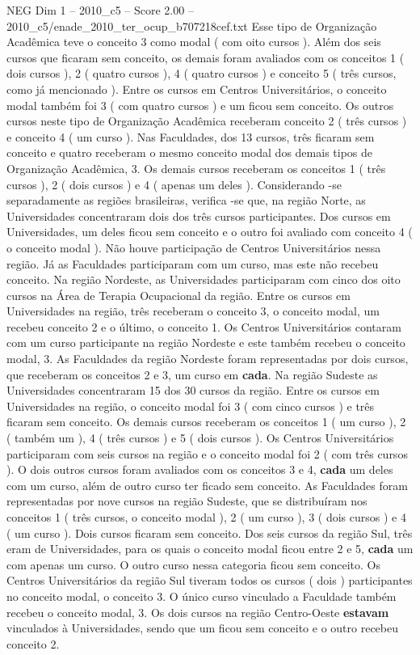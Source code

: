 \begin{textsample}{NEG Dim 1 – 2010\_c5 – Score 2.00 – 2010\_c5/enade\_2010\_ter\_ocup\_b707218cef.txt}
Esse tipo de Organização Acadêmica teve o conceito 3 como modal ( com oito cursos ).
Além dos seis cursos que ficaram sem conceito, os demais foram avaliados com os conceitos 1 ( dois cursos ), 2 ( quatro cursos ), 4 ( quatro cursos ) e conceito 5 ( três cursos, como já mencionado ).
Entre os cursos em Centros Universitários, o conceito modal também foi 3 ( com quatro cursos ) e um ficou sem conceito.
Os outros cursos neste tipo de Organização Acadêmica receberam conceito 2 ( três cursos ) e conceito 4 ( um curso ).
Nas Faculdades, dos 13 cursos, três ficaram sem conceito e quatro receberam o mesmo conceito modal dos demais tipos de Organização Acadêmica, 3.
Os demais cursos receberam os conceitos 1 ( três cursos ), 2 ( dois cursos ) e 4 ( apenas um deles ).
Considerando -se separadamente as regiões brasileiras, verifica -se que, na região Norte, as Universidades concentraram dois dos três cursos participantes.
Dos cursos em Universidades, um deles ficou sem conceito e o outro foi avaliado com conceito 4 ( o conceito modal ).
Não houve participação de Centros Universitários nessa região.
Já as Faculdades participaram com um curso, mas este não recebeu conceito.
Na região Nordeste, as Universidades participaram com cinco dos oito cursos na Área de Terapia Ocupacional da região.
Entre os cursos em Universidades na região, três receberam o conceito 3, o conceito modal, um recebeu conceito 2 e o último, o conceito 1.
Os Centros Universitários contaram com um curso participante na região Nordeste e este também recebeu o conceito modal, 3.
As Faculdades da região Nordeste foram representadas por dois cursos, que receberam os conceitos 2 e 3, um curso em \textbf{cada}.
Na região Sudeste as Universidades concentraram 15 dos 30 cursos da região.
Entre os cursos em Universidades na região, o conceito modal foi 3 ( com cinco cursos ) e três ficaram sem conceito.
Os demais cursos receberam os conceitos 1 ( um curso ), 2 ( também um ), 4 ( três cursos ) e 5 ( dois cursos ).
Os Centros Universitários participaram com seis cursos na região e o conceito modal foi 2 ( com três cursos ).
O dois outros cursos foram avaliados com os conceitos 3 e 4, \textbf{cada} um deles com um curso, além de outro curso ter ficado sem conceito.
As Faculdades foram representadas por nove cursos na região Sudeste, que se distribuíram nos conceitos 1 ( três cursos, o conceito modal ), 2 ( um curso ), 3 ( dois cursos ) e 4 ( um curso ).
Dois cursos ficaram sem conceito.
Dos seis cursos da região Sul, três eram de Universidades, para os quais o conceito modal ficou entre 2 e 5, \textbf{cada} um com apenas um curso.
O outro curso nessa categoria ficou sem conceito.
Os Centros Universitários da região Sul tiveram todos os cursos ( dois ) participantes no conceito modal, o conceito 3.
O único curso vinculado a Faculdade também recebeu o conceito modal, 3.
Os dois cursos na região Centro-Oeste \textbf{estavam} vinculados à Universidades, sendo que um ficou sem conceito e o outro recebeu conceito 2.

\end{textsample}
